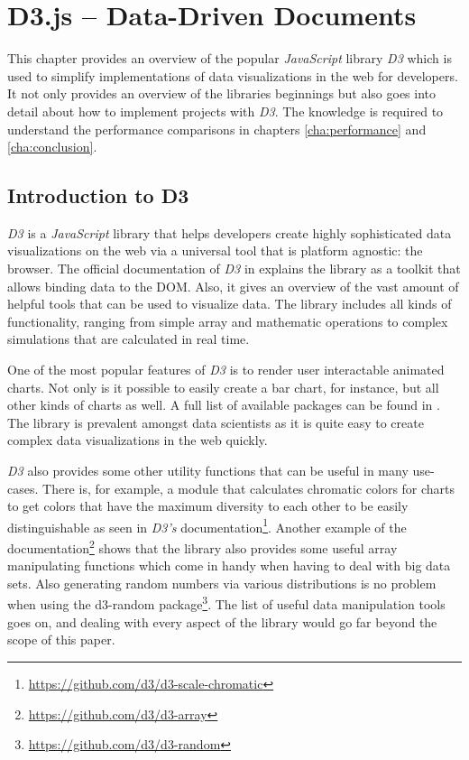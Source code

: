 \chapter{D3.js – Data-Driven Documents}
\label{cha:d3js}

This chapter provides an overview of the popular \emph{JavaScript} library \emph{D3} \cite{D3Website} which is used to simplify implementations of data visualizations in the web for developers. It not only provides an overview of the libraries beginnings but also goes into detail about how to implement projects with \emph{D3}. The knowledge is required to understand the performance comparisons in chapters \ref{cha:performance} and \ref{cha:conclusion}.


\section{Introduction to D3}

\emph{D3} is a \emph{JavaScript} library that helps developers create highly sophisticated data visualizations on the web via a universal tool that is platform agnostic: the browser. The official documentation of \emph{D3} in \cite{D3Website} explains the library as a toolkit that allows binding data to the DOM. Also, it gives an overview of the vast amount of helpful tools that can be used to visualize data. The library includes all kinds of functionality, ranging from simple array and mathematic operations to complex simulations that are calculated in real time.

One of the most popular features of \emph{D3} is to render user interactable animated charts. Not only is it possible to easily create a bar chart, for instance, but all other kinds of charts as well. A full list of available packages can be found in \cite{D3Github}. The library is prevalent amongst data scientists as it is quite easy to create complex data visualizations in the web quickly.

\emph{D3} also provides some other utility functions that can be useful in many use-cases. There is, for example, a module that calculates chromatic colors for charts to get colors that have the maximum diversity to each other to be easily distinguishable as seen in \emph{D3's} documentation\footnote{\url{https://github.com/d3/d3-scale-chromatic}}. Another example of the documentation\footnote{\url{https://github.com/d3/d3-array}} shows that the library also provides some useful array manipulating functions which come in handy when having to deal with big data sets. Also generating random numbers via various distributions is no problem when using the d3-random package\footnote{\url{https://github.com/d3/d3-random}}. The list of useful data manipulation tools goes on, and dealing with every aspect of the library would go far beyond the scope of this paper. 

